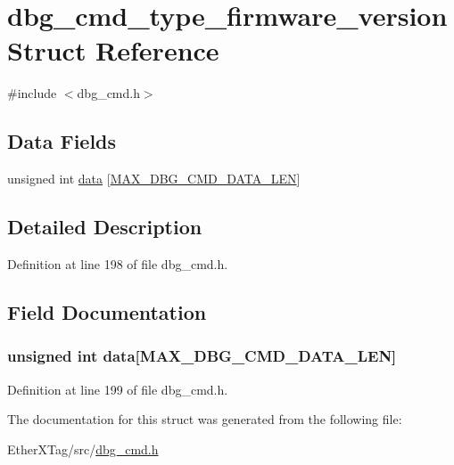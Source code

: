 \hypertarget{structdbg__cmd__type__firmware__version}{\section{dbg\-\_\-cmd\-\_\-type\-\_\-firmware\-\_\-version Struct Reference}
\label{structdbg__cmd__type__firmware__version}
}


{\ttfamily \#include $<$dbg\-\_\-cmd.\-h$>$}

\subsection*{Data Fields}
\begin{DoxyCompactItemize}
\item 
unsigned int \hyperlink{structdbg__cmd__type__firmware__version_abf020699b43e0c558a6fdf56f12b92ec}{data} \mbox{[}\hyperlink{dbg__cmd_8h_a4552ec15033c8a68870cdf80eda5470c}{M\-A\-X\-\_\-\-D\-B\-G\-\_\-\-C\-M\-D\-\_\-\-D\-A\-T\-A\-\_\-\-L\-E\-N}\mbox{]}
\end{DoxyCompactItemize}


\subsection{Detailed Description}


Definition at line 198 of file dbg\-\_\-cmd.\-h.



\subsection{Field Documentation}
\hypertarget{structdbg__cmd__type__firmware__version_abf020699b43e0c558a6fdf56f12b92ec}{
\subsubsection[{data}]{\setlength{\rightskip}{0pt plus 5cm}unsigned int data\mbox{[}{\bf M\-A\-X\-\_\-\-D\-B\-G\-\_\-\-C\-M\-D\-\_\-\-D\-A\-T\-A\-\_\-\-L\-E\-N}\mbox{]}}}\label{structdbg__cmd__type__firmware__version_abf020699b43e0c558a6fdf56f12b92ec}


Definition at line 199 of file dbg\-\_\-cmd.\-h.



The documentation for this struct was generated from the following file\-:\begin{DoxyCompactItemize}
\item 
Ether\-X\-Tag/src/\hyperlink{dbg__cmd_8h}{dbg\-\_\-cmd.\-h}\end{DoxyCompactItemize}
